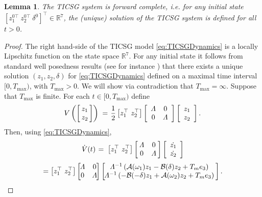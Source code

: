\documentclass[letterpaper, 10 pt, conference]{ieeeconf}
\newtheorem{lemma}[theorem]{Lemma}
\newcommand{\rline}  {{\mathbb R}}
\renewcommand{\o}    {{\omega}}
\newcommand{\half}   {{\frac{1}{2}}}
\newcommand{\m}      {{\hbox{\hskip 1pt}}}
\newcommand{\nm}     {{\hbox{\hskip -3pt}}}
\newcommand{\Amscr}  {{\mathcal{A}}}
\newcommand{\Bmscr}  {{\mathcal{B}}}
\begin{document}
\begin{lemma}\label{lemma:forewordComplete}
The TICSG system is forward complete, i.e. for any initial state
$\left[ z_1^{0\top} \ z_2^{0\top} \ \delta^{0} \right]^\top \in
\mathbb{R}^7 $, the (unique) solution of the TICSG system is defined
for all $t>0$.
\end{lemma}

\begin{proof} The right hand-side of the TICSG model 
\eqref{eq:TICSGDynamics} is a locally Lipschitz function on the state
space $\rline^7$. For any initial state it follows from standard well
posedness results (see for instance \cite[Ch.~3]{Khalil}) that there
exists a unique solution $(z_1,z_2,\delta)$ for
\eqref{eq:TICSGDynamics} defined on a maximal time interval
$[0,{T_{\max}})$, with ${T_{\max}}>0$. We will show via contradiction that
${T_{\max}}=\infty$. Suppose that $T_{\max}$ is finite. For each $t\in
[0,{T_{\max}})$ define
$$ V\left(\left[\nm\begin{array}{c} z_1\\ z_2\end{array}\nm\right]
   \right) \m=\m \half \left[z_1^\top\ z_2^\top\right]\left[
   \begin{array}{cc} \varLambda & 0\\ 0 & \varLambda \end{array}
   \right]\left[ \begin{array}{c} z_1\\ z_2 \end{array}\right].$$
Then, using \eqref{eq:TICSGDynamics},
$$ \dot{V}(t) \m=\m \left[ z_1^\top\ z_2^\top\right]\left[\nm
   \begin{array}{cc} \varLambda & 0\\ 0 & \varLambda \end{array}
   \nm\right]\left[\begin{array}{c} \dot{z_1}\\ \dot{z_2}
   \end{array}\right]$$ 
$$ = \left[z_1^\top\ z_2^\top\right]\left[\nm\nm
   \begin{array}{cc} \varLambda & 0\\ 0 & \varLambda \end{array}
   \nm\nm\right] \left[\nm\nm\begin{array}{c} \varLambda^{-1}
   \left( \Amscr(\o_1)z_1-\Bmscr(\delta)z_2+T_me_3\right)
   \\ \varLambda^{-1}\left(-\mathcal{B}(-\delta)z_1+\mathcal{A}
   (\o_2)z_2+T_m e_3\right) \end{array}\nm\right].$$

\end{proof}
\end{document}
